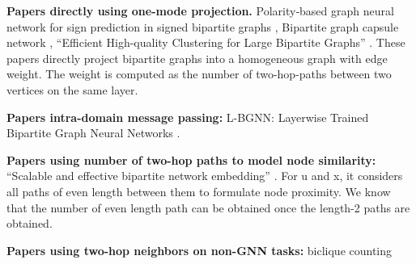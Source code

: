 \noindent
{\bf Papers directly using one-mode projection. }
Polarity‑based graph neural network for sign prediction in signed bipartite graphs \cite{zhang2022polarity}, Bipartite graph capsule network \cite{zhang2023bipartite}, ``Efficient High-quality Clustering for Large Bipartite Graphs'' \cite{yang2023efficient}. These papers directly project bipartite graphs into a homogeneous graph with edge weight. The weight is computed as the number of two-hop-paths between two vertices on the same layer. 


\noindent
{\bf Papers intra-domain message passing: }
L-BGNN: Layerwise Trained Bipartite Graph Neural Networks \cite{xie2022bgnn}. 


\noindent
{\bf Papers using number of two-hop paths to model node similarity:}
``Scalable and effective bipartite network embedding'' \cite{yang2022scalable}. 
For u and x, it considers all paths of even length between them to formulate node proximity. We know that the number of even length path can be obtained once the length-2 paths are obtained. 

\noindent
{\bf Papers using two-hop neighbors on non-GNN tasks:}
biclique counting \cite{qiu2024accelerating}












